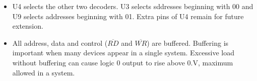 \begin{itemize}
  \item U4 selects the other two decoders. U3 selects sddresses beginning with 00 and U9 selects addresses beginning with 01. Extra pins of U4 remain for future extension.
  \item All address, data and control ($\overline{RD}$ and $\overline{WR}$) are buffered. Buffering is important when many devices appear in a single system. Excessive load without buffering can cause logic 0 output to rise above 0.V, maximum allowed in a system.
\end{itemize}
